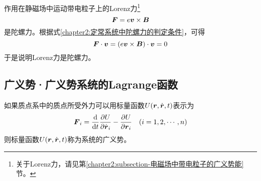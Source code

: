 \begin{example}
作用在静磁场中运动带电粒子上的Lorenz力\footnote{关于Lorenz力，请见第\ref{chapter2:subsection-电磁场中带电粒子的广义势能}节。}
\begin{equation*}
	\boldsymbol{F} = e\boldsymbol{v}\times \boldsymbol{B}
\end{equation*}
是陀螺力。根据式\eqref{chapter2:定常系统中陀螺力的判定条件}，可得
\begin{equation*}
	\boldsymbol{F} \cdot \boldsymbol{v} = (e\boldsymbol{v}\times \boldsymbol{B})\cdot \boldsymbol{v} = 0
\end{equation*}
于是说明Lorenz力是陀螺力。
\end{example}

\subsection{广义势·广义势系统的Lagrange函数}

如果质点系中的质点所受外力可以用标量函数$U(\boldsymbol{r},\dot{\boldsymbol{r}},t)$表示为
\begin{equation}
	\boldsymbol{F}_i = \frac{\mathrm{d}}{\mathrm{d} t} \frac{\partial U}{\partial \dot{\boldsymbol{r}}_i} - \frac{\partial U}{\partial \boldsymbol{r}_i}\quad (i = 1,2,\cdots,n)
	\label{广义势关系}
\end{equation}
则标量函数$U(\boldsymbol{r},\dot{\boldsymbol{r}},t)$称为系统的{\heiti 广义势}。


